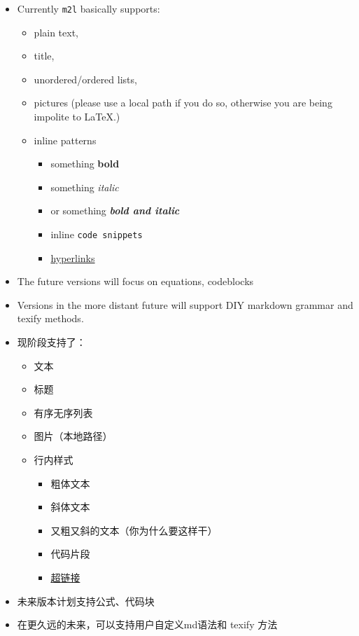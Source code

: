\documentclass{ctexart}
\begin{document}
	\begin{itemize}
		\item Currently \texttt{m2l} basically supports:
		\begin{itemize}
			\item plain text,
			\item title,
			\item unordered/ordered lists,
			\item pictures (please use a local path if you do so, otherwise you are being impolite to LaTeX.)
			\item inline patterns
			\begin{itemize}
				\item something \textbf{bold}
				\item something \textit{italic}
				\item or something \textbf{\textit{bold and italic}}
				\item inline \texttt{code snippets}
				\item \href{https://http.cat/404}{hyperlinks}
			\end{itemize}
		\end{itemize}
		\item The future versions will focus on equations, codeblocks
		\item Versions in the more distant future will support DIY markdown grammar and texify methods.
	\end{itemize}

	\begin{itemize}
		\item 现阶段支持了：
		\begin{itemize}
			\item 文本
			\item 标题
			\item 有序无序列表
			\item 图片（本地路径）
			\item 行内样式
			\begin{itemize}
				\item 粗体文本
				\item 斜体文本
				\item 又粗又斜的文本（你为什么要这样干）
				\item 代码片段
				\item \href{https://http.cat/404}{超链接}
			\end{itemize}
		\end{itemize}
		\item 未来版本计划支持公式、代码块
		\item 在更久远的未来，可以支持用户自定义md语法和 texify 方法
	\end{itemize}
\end{document}
